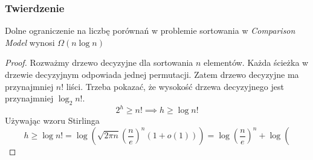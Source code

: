 \documentclass[11pt,a4paper]{article}
\begin{document}
\subsubsection{Twierdzenie}
Dolne ograniczenie na liczbę porównań w problemie sortowania w \textit{Comparison Model} wynosi $\Omega(n \log n)$
\begin{proof}
    Rozważmy drzewo decyzyjne dla sortowania $n$ elementów. Każda ścieżka w drzewie decyzyjnym odpowiada jednej permutacji. Zatem drzewo decyzyjne ma przynajmniej $n!$ liści. Trzeba pokazać, że wysokość drzewa decyzyjnego jest przynajmniej $\log_2 n!$.
    \[
        2^h \geq n! \implies h \geq \log n!
    \]
    Używając wzoru Stirlinga
    \[ %
        h \geq \log n! = \log \left( \sqrt{2\pi n} \left( \frac{n}{e} \right)^n \left(1+ o(1)\right) \right) = \log \left(\frac{n}{e}\right)^n + \log \left(
    \]
\end{proof}
\end{document}
